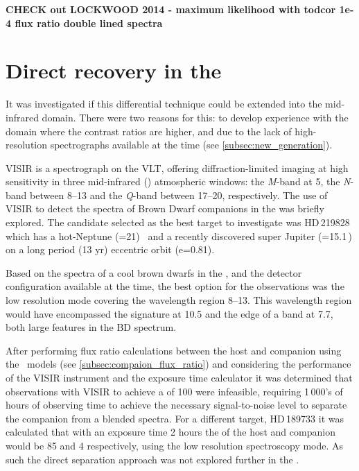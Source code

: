 \textbf{
CHECK out LOCKWOOD 2014 - maximum likelihood with todcor 1e-4 flux ratio double lined spectra}




\section{Direct recovery in the \mir{}}
It was investigated if this differential technique could be extended into the mid-infrared {\mir{}} domain.
There were two reasons for this: to develop experience with the {\mir{}} domain where the contrast ratios are higher, and due to the lack of high-resolution \nir{} spectrographs available at the time (see \cref{subsec:new_generation}).

{VISIR} is a \mir{} spectrograph on the {VLT}, offering diffraction-limited imaging at high sensitivity in three mid-infrared (\mir) atmospheric windows: the \emph{M}-band at 5\um{}, the \emph{N}-band between 8--13\um{} and the \emph{Q}-band between 17--20\um{}, respectively.
The use of {VISIR} to detect the spectra of Brown Dwarf companions in the {\mir{}} was briefly explored.
The candidate selected as the best target to investigate was {HD\,219828} which has a hot-Neptune (\Mtwosini{}=21\Mearth)~\citep{melo_new_2007} and a recently discovered super Jupiter (\Mtwosini{}=15.1\,\Mjup) on a long period (13 yr) eccentric orbit (e=0.81)\citep{santos_extreme_2016}.

Based on the spectra of a cool brown dwarfs in the \mir{}, and the detector configuration available at the time, the best option for the observations was the low resolution mode covering the wavelength region 8--13\um{}.
This wavelength region would have encompassed the  signature at 10.5\um{} and the edge of a  band at 7.7\um{}, both large features in the BD \mir{} spectrum.

After performing flux ratio calculations between the host and companion using the~\citet{baraffe_evolutionary_2003} models (see \cref{subsec:compaion_flux_ratio}) and considering the performance of the {VISIR} instrument and the exposure time calculator it was determined that observations with {VISIR} to achieve a \snr{} of 100 were infeasible, requiring 1\,000's of hours of observing time to achieve the necessary signal-to-noise level to separate the companion from a blended spectra.
For a different target, {HD\,189733} it was calculated that with an exposure time 2 hours the \snr{} of the host and companion would be 85 and 4 respectively, using the low resolution spectroscopy mode.
As such the direct separation approach was not explored further in the \mir{}.



